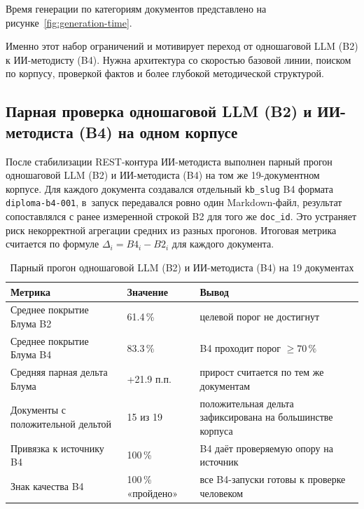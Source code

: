 Время генерации по категориям документов представлено на рисунке~\ref{fig:generation-time}.



Именно этот набор ограничений и мотивирует переход от одношаговой LLM (B2)
к ИИ-методисту (B4). Нужна архитектура со скоростью базовой линии,
поиском по корпусу, проверкой фактов и более глубокой методической структурой.

\subsection[Парная проверка LLM-конфигурации (B2) и ИИ-методиста (B4)]{Парная проверка одношаговой LLM (B2) и ИИ-методиста (B4) на одном корпусе}

После стабилизации REST-контура ИИ-методиста выполнен парный прогон
одношаговой LLM (B2) и ИИ-методиста (B4) на том же 19-документном корпусе.
Для каждого документа
создавался отдельный \texttt{kb\_slug} B4 формата
\texttt{diploma-b4-001}, в~запуск передавался ровно один Markdown-файл,
результат сопоставлялся с ранее измеренной строкой B2 для того же
\texttt{doc\_id}. Это устраняет риск некорректной агрегации средних
из разных прогонов. Итоговая метрика считается по формуле
$\Delta_i = B4_i - B2_i$ для каждого документа.

\begin{table}[H]
  \caption{Парный прогон одношаговой LLM (B2) и ИИ-методиста (B4) на 19 документах}
  \label{tab:paired-b2-b4}
  \centering
  \begin{tabular}{|P{5.8cm}|P{2.5cm}|P{4.8cm}|}
  \hline
  \textbf{Метрика} & \textbf{Значение} & \textbf{Вывод} \\
  \hline
  Среднее покрытие Блума B2 & 61.4\,\% & целевой порог не достигнут \\
  \hline
  Среднее покрытие Блума B4 & 83.3\,\% & B4 проходит порог $\geq 70\,\%$ \\
  \hline
  Средняя парная дельта Блума & +21.9 п.п. & прирост считается по тем же документам \\
  \hline
  Документы с положительной дельтой & 15 из 19 & положительная дельта зафиксирована на большинстве корпуса \\
  \hline
  Привязка к источнику B4 & 100\,\% & B4 даёт проверяемую опору на источник \\
  \hline
  Знак качества B4 & 100\,\% «пройдено» & все B4-запуски готовы к проверке человеком \\
  \hline
  \end{tabular}
\end{table}

